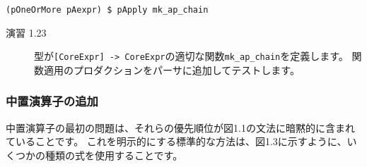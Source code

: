 \documentclass{jarticle}
\begin{document}
\begin{verbatim}
(pOneOrMore pAexpr) $ pApply mk_ap_chain
\end{verbatim}

\begin{description}
	\item[演習 1.23] 型が\texttt{[CoreExpr] -> CoreExpr}の適切な関数\texttt{mk\_ap\_chain}を定義します。
	      関数適用のプロダクションをパーサに追加してテストします。
\end{description}

\subsubsection{中置演算子の追加}

中置演算子の最初の問題は、それらの優先順位が図1.1の文法に暗黙的に含まれていることです。
これを明示的にする標準的な方法は、図1.3に示すように、いくつかの種類の式を使用することです。
\end{document}
